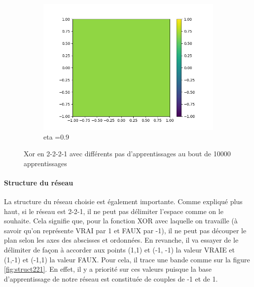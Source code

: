 \begin{figure}[ht!]
\begin{subfigure}[b]{.3\linewidth}
    \includegraphics[width=\linewidth]{fig/xor2221_eta09.png}
    \caption{eta =0.9}
  \end{subfigure}
  \caption{Xor en 2-2-2-1 avec différents pas d'apprentissages au bout de 10000 apprentissages}
  \label{fig:2_2_2_1}
\end{figure}

\paragraph{Structure du réseau}
	La structure du réseau choisie est également importante. Comme expliqué plus haut, si le réseau est 2-2-1, il ne peut pas délimiter l'espace comme on le souhaite. Cela signifie que, pour la fonction XOR avec laquelle on travaille (à savoir qu'on représente VRAI par 1 et FAUX par -1), il ne peut pas découper le plan selon les axes des abscisses et ordonnées. En revanche, il va essayer de le délimiter de façon à accorder aux points (1,1) et (-1, -1) la valeur VRAIE et (1,-1) et (-1,1) la valeur FAUX. Pour cela, il trace une bande comme sur la figure \ref{fig:struct221}. En effet, il y a priorité sur ces valeurs puisque la base d'apprentissage de notre réseau est constituée de couples de -1 et de 1.
	

